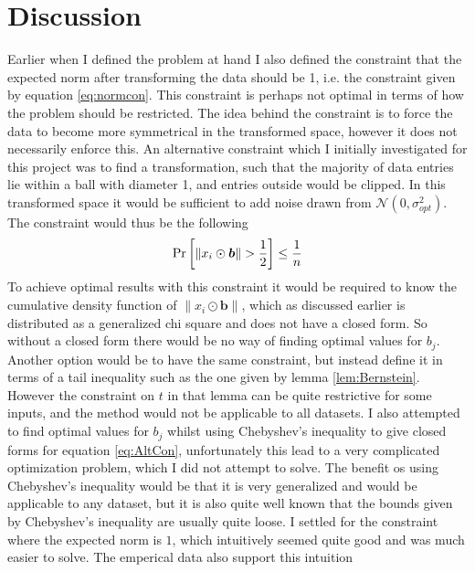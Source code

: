 \documentclass[a4paper,12pt]{article}
\begin{document}
\section{Discussion}
Earlier when I defined the problem at hand I also defined the constraint that the expected norm after 
transforming the data should be 1, i.e. the constraint given by equation \eqref{eq:normcon}. 
This constraint is perhaps not optimal in terms of how the problem should be restricted. The idea behind the constraint
is to force the data to become more symmetrical in the transformed space, however it does not necessarily enforce this. 
An alternative constraint which I initially investigated for this project was to find a transformation, such that the majority of 
data entries lie within a ball with diameter 1, and entries outside would be clipped.
In this transformed space it would be sufficient to add noise drawn from
$\mathcal{N}(0, \sigma_{opt}^2)$. The constraint would thus be the following
\begin{equation}
\label{eq:AltCon}
    \Pr\left [ \| x_i \odot \bm{b} \| > \frac{1}{2} \right] \le \frac{1}{n} 
\end{equation}
To achieve optimal results with this constraint it would be required to know the cumulative density function of $\| x_i \odot \bm{b} \|$, 
which as discussed earlier is distributed as a generalized chi square and does not have a closed form. 
So without a closed form there would be no way of finding optimal values for $b_j$. 
Another option would be to have the same constraint, but instead define it in terms of a tail inequality such as the one
given by lemma \ref{lem:Bernstein}. However the constraint on $t$ in that lemma can be quite restrictive for some inputs, 
and the method would not be applicable to all datasets.
I also attempted to find optimal values for $b_j$ whilst using Chebyshev's inequality to give closed forms for equation \eqref{eq:AltCon}, 
unfortunately this lead to a very complicated optimization problem, which I did not attempt to solve.
The benefit os using Chebyshev's inequality would be that it is very generalized and would be applicable to any dataset, 
but it is also quite well known that the bounds given by Chebyshev's inequality are usually quite loose. 
I settled for the constraint where the expected norm is $1$, which intuitively seemed quite good and was much easier to solve. 
The emperical data also support this intuition \\
\end{document}
